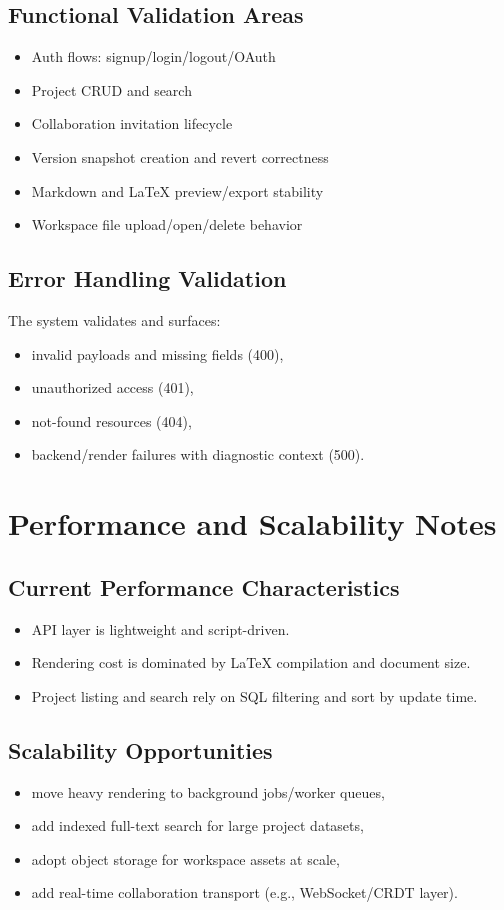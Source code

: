 \documentclass[11pt,a4paper]{article}
\begin{document}
\subsection{Functional Validation Areas}
\begin{itemize}[leftmargin=1.5em]
  \item Auth flows: signup/login/logout/OAuth
  \item Project CRUD and search
  \item Collaboration invitation lifecycle
  \item Version snapshot creation and revert correctness
  \item Markdown and LaTeX preview/export stability
  \item Workspace file upload/open/delete behavior
\end{itemize}

\subsection{Error Handling Validation}
The system validates and surfaces:
\begin{itemize}[leftmargin=1.5em]
  \item invalid payloads and missing fields (400),
  \item unauthorized access (401),
  \item not-found resources (404),
  \item backend/render failures with diagnostic context (500).
\end{itemize}

\section{Performance and Scalability Notes}
\subsection{Current Performance Characteristics}
\begin{itemize}[leftmargin=1.5em]
  \item API layer is lightweight and script-driven.
  \item Rendering cost is dominated by LaTeX compilation and document size.
  \item Project listing and search rely on SQL filtering and sort by update time.
\end{itemize}

\subsection{Scalability Opportunities}
\begin{itemize}[leftmargin=1.5em]
  \item move heavy rendering to background jobs/worker queues,
  \item add indexed full-text search for large project datasets,
  \item adopt object storage for workspace assets at scale,
  \item add real-time collaboration transport (e.g., WebSocket/CRDT layer).
\end{itemize}
\end{document}
